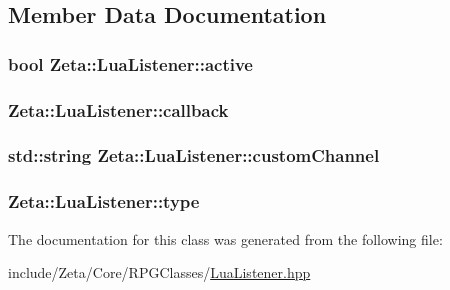 \subsection{Member Data Documentation}
\hypertarget{classZeta_1_1LuaListener_a6e7d565c03b9774a1c8222abaa88a37b}{
\subsubsection[{active}]{\setlength{\rightskip}{0pt plus 5cm}bool Zeta\+::\+Lua\+Listener\+::active\hspace{0.3cm}{\ttfamily [private]}}}\label{classZeta_1_1LuaListener_a6e7d565c03b9774a1c8222abaa88a37b}
\hypertarget{classZeta_1_1LuaListener_a5ed6fcdda5ab83eeb8a3fea904f22aaf}{
\subsubsection[{callback}]{ Zeta\+::\+Lua\+Listener\+::callback\hspace{0.3cm}{\ttfamily [private]}}}\label{classZeta_1_1LuaListener_a5ed6fcdda5ab83eeb8a3fea904f22aaf}
\hypertarget{classZeta_1_1LuaListener_a54cdfbad704945bc74e36ef3af9eaaed}{
\subsubsection[{custom\+Channel}]{\setlength{\rightskip}{0pt plus 5cm}std\+::string Zeta\+::\+Lua\+Listener\+::custom\+Channel\hspace{0.3cm}{\ttfamily [private]}}}\label{classZeta_1_1LuaListener_a54cdfbad704945bc74e36ef3af9eaaed}
\hypertarget{classZeta_1_1LuaListener_acec59aa6dc0dcec125e577da5b2c42b5}{
\subsubsection[{type}]{ Zeta\+::\+Lua\+Listener\+::type\hspace{0.3cm}{\ttfamily [private]}}}\label{classZeta_1_1LuaListener_acec59aa6dc0dcec125e577da5b2c42b5}


The documentation for this class was generated from the following file\+:\begin{DoxyCompactItemize}
\item 
include/\+Zeta/\+Core/\+R\+P\+G\+Classes/\hyperlink{LuaListener_8hpp}{Lua\+Listener.\+hpp}\end{DoxyCompactItemize}
